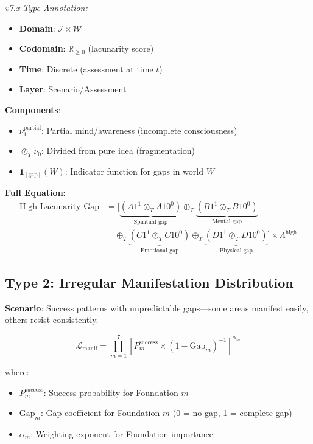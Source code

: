 \documentclass[11pt,twoside]{book}
\newcommand{\noe}[1]{\nu_{#1}}
\newcommand{\Ideas}{\mathcal{I}}
\newcommand{\Worlds}{\mathcal{W}}
\newcommand{\Tadd}{\oplus_T}
\newcommand{\Tdiv}{\oslash_T}
\newcommand{\Lacunarity}{\Lambda}
\begin{document}
\textit{v7.x Type Annotation:}
\begin{itemize}
    \item \textbf{Domain}: $\Ideas \times \Worlds$
    \item \textbf{Codomain}: $\mathbb{R}_{\geq 0}$ (lacunarity score)
    \item \textbf{Time}: Discrete (assessment at time $t$)
    \item \textbf{Layer}: Scenario/Assessment
\end{itemize}

\textbf{Components}:
\begin{itemize}
    \item $\noe{1}^{\mathrm{partial}}$: Partial mind/awareness (incomplete consciousness)
    \item $\Tdiv \noe{0}$: Divided from pure idea (fragmentation)
    \item $\mathbf{1}_{[\mathrm{gap}]}(W)$: Indicator function for gaps in world $W$
\end{itemize}

\textbf{Full Equation}:
\begin{align}
    \text{High\_Lacunarity\_Gap} &= \biggl[
    \underbrace{(A1^1 \Tdiv A10^0)}_{\text{Spiritual gap}}
    \Tadd \underbrace{(B1^1 \Tdiv B10^0)}_{\text{Mental gap}} \nonumber \\
    &\quad \Tadd \underbrace{(C1^1 \Tdiv C10^0)}_{\text{Emotional gap}}
    \Tadd \underbrace{(D1^1 \Tdiv D10^0)}_{\text{Physical gap}}
    \biggr] \times \Lacunarity^{\mathrm{high}}
\end{align}

\subsection{Type 2: Irregular Manifestation Distribution}

\textbf{Scenario}: Success patterns with unpredictable gaps---some areas manifest easily,
others resist consistently.

\begin{equation}
\boxed{
    \mathcal{L}_{\mathrm{manif}} = \prod_{m=1}^{7} \left[
    P_m^{\mathrm{success}} \times (1 - \mathrm{Gap}_{m})^{-1}
    \right]^{\alpha_m}
}
\end{equation}

where:
\begin{itemize}
    \item $P_m^{\mathrm{success}}$: Success probability for Foundation $m$
    \item $\mathrm{Gap}_m$: Gap coefficient for Foundation $m$ (0 = no gap, 1 = complete gap)
    \item $\alpha_m$: Weighting exponent for Foundation importance
\end{itemize}
\end{document}
